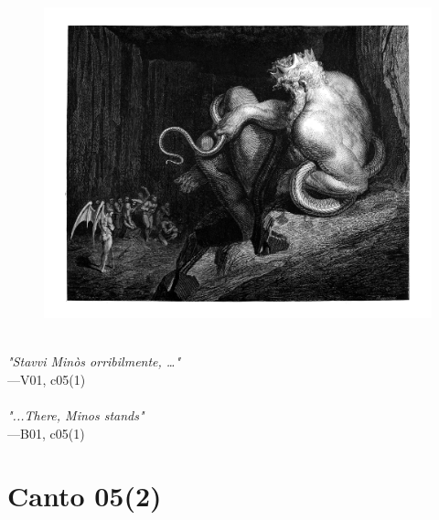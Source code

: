 \documentclass[../Dore_vision.tex]{subfiles}
\begin{document}
\begin{figure}[ht]
\centering
\includegraphics[height=\figsize]{illustrations/book_1/V01, c05(1).jpg}
\end{figure}

\begin{center}
\begin{minipage}{0.8\linewidth}
\textit{\\
"Stavvi Minòs orribilmente, …"} \\
—V01, c05(1) \\~\\
\textit{"...There, Minos stands"} \\
—B01, c05(1)
\end{minipage}
\end{center}

\newpage

\section{Canto 05(2)}
\end{document}
